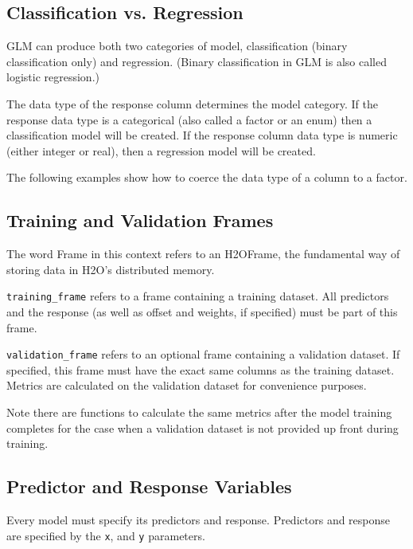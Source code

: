 \subsection{Classification vs. Regression}

GLM can produce both two categories of model, classification (binary classification only) and regression.  (Binary
classification in GLM is also called logistic regression.)

The data type of the response column determines the model category.  If the response data type is a categorical
(also called a factor or an enum) then a classification model will be created.  If the response column data type is
numeric (either integer or real), then a regression model will be created.

The following examples show how to coerce the data type of a column to a factor.

\bigskip
\waterExampleInR


\waterExampleInPython


\subsection{Training and Validation Frames}

The word Frame in this context refers to an H2OFrame, the fundamental way of storing data in H2O's distributed memory.

\texttt{training\_frame} refers to a frame containing a training dataset.  All predictors and the response (as
well as offset and weights, if specified) must be part of this frame.

\texttt{validation\_frame} refers to an optional frame containing a validation dataset.  If specified, this 
frame must have the exact same columns as the training dataset.  Metrics are calculated on the validation dataset
for convenience purposes.

Note there are functions to calculate the same metrics after the model training completes for the case when a
validation dataset is not provided up front during training.

\subsection{Predictor and Response Variables}

Every model must specify its predictors and response.  Predictors and response are specified by the \texttt{x},
and \texttt{y} parameters.

